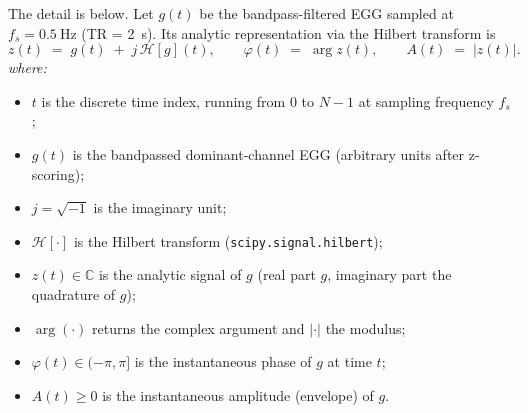 \documentclass[11pt]{article}
\newcommand{\Hilbert}{\mathcal{H}}
\begin{document}
The detail is below. Let $g(t)$ be the bandpass-filtered EGG sampled at
$f_s = \SI{0.5}{\hertz}$ (TR = 2~s). Its analytic representation via the
Hilbert transform is
\begin{equation}
z(t) \;=\; g(t) \;+\; j\,\Hilbert[g](t), \qquad
\varphi(t) \;=\; \arg z(t), \qquad
A(t) \;=\; |z(t)|.
\end{equation}
\textit{where:}
\begin{itemize}\setlength{\itemsep}{1pt}
\item $t$ is the discrete time index, running from $0$ to $N-1$ at
sampling frequency $f_s$;
\item $g(t)$ is the bandpassed dominant-channel EGG (arbitrary units
after z-scoring);
\item $j = \sqrt{-1}$ is the imaginary unit;
\item $\Hilbert[\cdot]$ is the Hilbert transform
(\texttt{scipy.signal.hilbert});
\item $z(t)\in\mathbb{C}$ is the analytic signal of $g$ (real part $g$,
imaginary part the quadrature of $g$);
\item $\arg(\cdot)$ returns the complex argument and $|\cdot|$ the
modulus;
\item $\varphi(t)\in(-\pi,\pi]$ is the instantaneous phase of $g$ at
time $t$;
\item $A(t)\geq 0$ is the instantaneous amplitude (envelope) of $g$.
\end{itemize}
\end{document}

